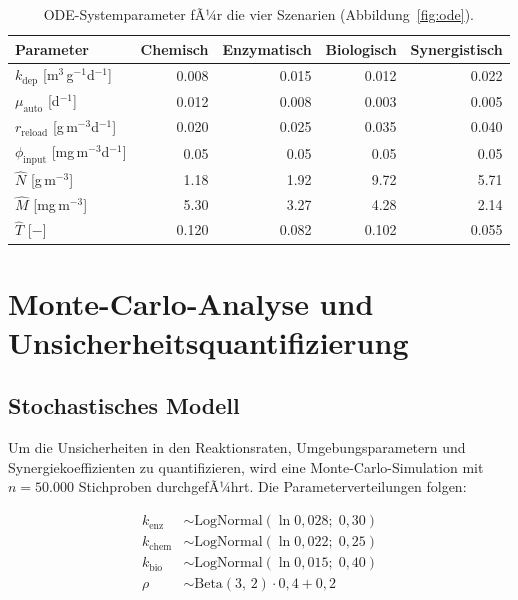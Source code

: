 ﻿\documentclass[12pt,a4paper]{article}
\theoremstyle{definition}
\theoremstyle{remark}
\begin{document}
\begin{table}[H]
\centering
\caption{ODE-Systemparameter fÃ¼r die vier Szenarien (Abbildung~\ref{fig:ode}).}
\label{tab:ode_params}
\begin{tabular}{lrrrr}
\toprule
\textbf{Parameter} & \textbf{Chemisch} & \textbf{Enzymatisch} & \textbf{Biologisch} & \textbf{Synergistisch} \\
\midrule
$k_{\text{dep}}$ [m$^3$\,g$^{-1}$d$^{-1}$] & 0.008 & 0.015 & 0.012 & 0.022 \\
$\mu_{\text{auto}}$ [d$^{-1}$] & 0.012 & 0.008 & 0.003 & 0.005 \\
$r_{\text{reload}}$ [g\,m$^{-3}$d$^{-1}$] & 0.020 & 0.025 & 0.035 & 0.040 \\
$\phi_{\text{input}}$ [mg\,m$^{-3}$d$^{-1}$] & 0.05 & 0.05 & 0.05 & 0.05 \\
$\hat{N}$ [g\,m$^{-3}$] & 1.18 & 1.92 & 9.72 & 5.71 \\
$\hat{M}$ [mg\,m$^{-3}$] & 5.30 & 3.27 & 4.28 & 2.14 \\
$\hat{T}$ [$-$] & 0.120 & 0.082 & 0.102 & 0.055 \\
\bottomrule
\end{tabular}
\end{table}

\section{Monte-Carlo-Analyse und Unsicherheitsquantifizierung}
\label{sec:montecarlo}

\subsection{Stochastisches Modell}

Um die Unsicherheiten in den Reaktionsraten, Umgebungsparametern und
Synergiekoeffizienten zu quantifizieren, wird eine Monte-Carlo-Simulation
mit $n = 50.000$ Stichproben durchgefÃ¼hrt. Die Parameterverteilungen folgen:

\begin{align}
  k_{\text{enz}} &\sim \text{LogNormal}(\ln 0{,}028;\; 0{,}30)
  \label{eq:mc_kenz}\\
  k_{\text{chem}} &\sim \text{LogNormal}(\ln 0{,}022;\; 0{,}25)
  \label{eq:mc_kchem}\\
  k_{\text{bio}} &\sim \text{LogNormal}(\ln 0{,}015;\; 0{,}40)
  \label{eq:mc_kbio}\\
  \rho &\sim \text{Beta}(3,\,2) \cdot 0{,}4 + 0{,}2
  \label{eq:mc_rho}
\end{align}
\end{document}
